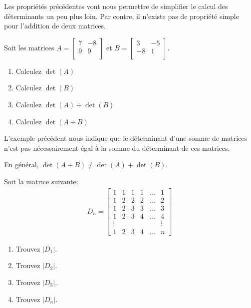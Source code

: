 \documentclass[]{book}
\providecommand{\tightlist}{%
  \setlength{\itemsep}{0pt}\setlength{\parskip}{0pt}}
\theoremstyle{definition}
\theoremstyle{definition}
\theoremstyle{definition}
\theoremstyle{remark}
\let\BeginKnitrBlock\begin \let\EndKnitrBlock\end
\begin{document}
Les propriétés précédentes vont nous permettre de simplifier le calcul des déterminants un peu plus loin. Par contre, il n'existe pas de propriété simple pour l'addition de deux matrices.

\BeginKnitrBlock{example}
\protect\hypertarget{exm:unnamed-chunk-104}{}{\label{exm:unnamed-chunk-104} }Soit les matrices
\(A=\begin{bmatrix} 7&-8\\ 9&9\\ \end{bmatrix}\) et
\(B=\begin{bmatrix} 3&-5\\ -8&1\\ \end{bmatrix}\).

\begin{enumerate}
\def\labelenumi{\alph{enumi}.}
\tightlist
\item
  Calculez \(\det(A)\)
\item
  Calculez \(\det(B)\)
\item
  Calculez \(\det(A)+\det(B)\)
\item
  Calculez \(\det(A+B)\)
\end{enumerate}
\EndKnitrBlock{example}

L'exemple précédent nous indique que le déterminant d'une somme de matrices n'est pas nécessairement égal à la somme du déterminant de ces matrices.

\BeginKnitrBlock{remark}
{}En général, \(\det(A+B)\neq \det(A)+\det(B)\).
\EndKnitrBlock{remark}

\BeginKnitrBlock{example}
\protect\hypertarget{exm:unnamed-chunk-106}{}{\label{exm:unnamed-chunk-106} }Soit la matrice suivante:
\begin{align*}
D_n =\begin{bmatrix}
1 & 1 & 1 & 1 & \ldots & 1 \\
1 & 2 & 2 & 2 & \ldots & 2 \\
1 & 2 & 3 & 3 & \ldots & 3 \\
1 & 2 & 3 & 4 & \ldots & 4 \\
\vdots &&&&& \vdots \\
1 & 2 & 3 & 4 & \ldots & n
\end{bmatrix}
\end{align*}

\begin{enumerate}
\def\labelenumi{\alph{enumi}.}
\tightlist
\item
  Trouvez \(\vert D_1\vert\).
\item
  Trouvez \(\vert D_2\vert\).
\item
  Trouvez \(\vert D_3\vert\).
\item
  Trouvez \(\vert D_n\vert\).
\end{enumerate}
\EndKnitrBlock{example}
\end{document}
